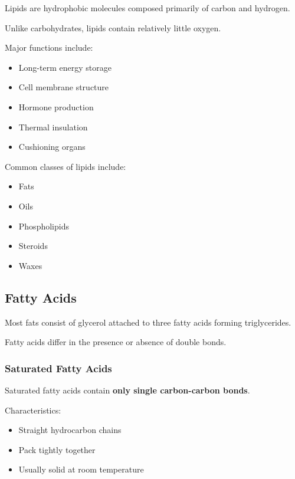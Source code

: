 \documentclass[
  letterpaper,
  DIV=11,
  numbers=noendperiod]{scrreprt}
\begin{document}
Lipids are hydrophobic molecules composed primarily of carbon and
hydrogen.

Unlike carbohydrates, lipids contain relatively little oxygen.

Major functions include:

\begin{itemize}
\item
  Long-term energy storage
\item
  Cell membrane structure
\item
  Hormone production
\item
  Thermal insulation
\item
  Cushioning organs
\end{itemize}

Common classes of lipids include:

\begin{itemize}
\item
  Fats
\item
  Oils
\item
  Phospholipids
\item
  Steroids
\item
  Waxes
\end{itemize}

\subsection{\texorpdfstring{\textbf{Fatty
Acids}}{Fatty Acids}}\label{fatty-acids}

Most fats consist of glycerol attached to three fatty acids forming
triglycerides.

Fatty acids differ in the presence or absence of double bonds.

\subsubsection{\texorpdfstring{\textbf{Saturated Fatty
Acids}}{Saturated Fatty Acids}}\label{saturated-fatty-acids}

Saturated fatty acids contain \textbf{only single carbon-carbon bonds}.

Characteristics:

\begin{itemize}
\item
  Straight hydrocarbon chains
\item
  Pack tightly together
\item
  Usually solid at room temperature
\end{itemize}
\end{document}
